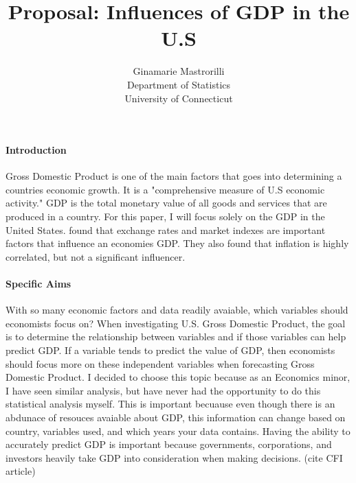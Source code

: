 \documentclass[12pt]{article}
\title{Proposal: Influences of GDP in the U.S }
\author{Ginamarie Mastrorilli\\
  Department of Statistics\\
  University of Connecticut
}
\begin{document}
\maketitle


\paragraph{Introduction}
Gross Domestic Product is one of the main factors that goes into determining a countries economic growth. 
It is a "comprehensive measure of U.S economic activity." \citet[]{BureauofEconomicAnalysis}
GDP is the total monetary value of all goods and services that are produced in a country. For this paper, I will focus solely on the GDP in the United States. 
\citet{divya2014study} found that exchange rates and market indexes are important factors that influence an economies GDP. They also found that inflation is highly correlated, but not a significant influencer.  

\paragraph{Specific Aims}
With so many economic factors and data readily avaiable, which variables should economists focus on?
When investigating U.S. Gross Domestic Product, the goal is to determine the relationship between variables and if those variables can help predict GDP.
If a variable tends to predict the value of GDP, then economists should focus more on these independent variables when forecasting Gross Domestic Product.
I decided to choose this topic because as an Economics minor, I have seen similar analysis, but have never had the opportunity to do this statistical analysis myself. 
This is important becuause even though there is an abdunace of resouces avaiable about GDP, this information can change based on country, variables used, and which years your data contains. 
Having the ability to accurately predict GDP is important because governments, corporations, and investors heavily take GDP into consideration when making decisions. (cite CFI article)
\end{document}
